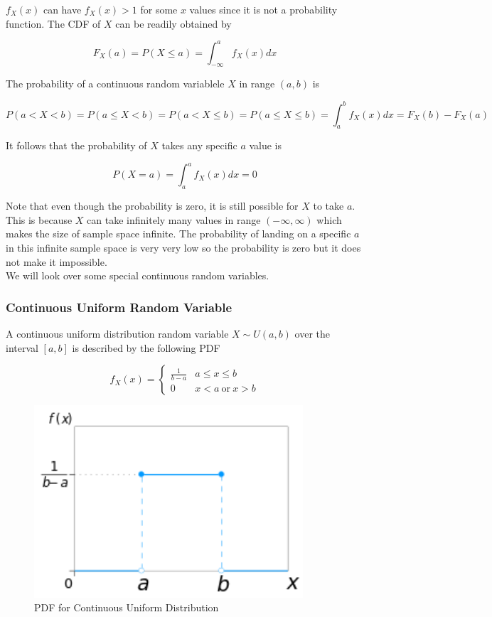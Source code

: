 \documentclass[12pt, a4paper]{article}
\begin{document}
$f_X(x)$ can have $f_X(x)>1$ for some $x$ values since it is not a probability function. The CDF of $X$ can be readily obtained by

$$F_X(a)=P(X\le a)=\int_{-\infty}^a f_X(x) dx$$

The probability of a continuous random variablele $X$ in range $(a,b)$ is

$$P(a < X < b)=P(a \le X < b)=P(a < X \le b)=P(a \le X \le b)=\int_a^b f_X(x) dx = F_X(b)-F_X(a)$$

It follows that the probability of $X$ takes any specific $a$ value is

$$P(X=a)=\int_{a}^a f_X(x) dx=0$$

Note that even though the probability is zero, it is still possible for $X$ to take $a$. This is because $X$ can take infinitely many values in range $(-\infty,\infty)$ which makes the size of sample space infinite. The probability of landing on a specific $a$ in this infinite sample space is very very low so the probability is zero but it does not make it impossible. \\

We will look over some special continuous random variables.

\subsubsection{Continuous Uniform Random Variable}

A continuous uniform distribution random variable $X\sim U(a, b)$ over the interval $[a,b]$ is described by the following PDF

$$
f_X(x)=\begin{cases}
\frac{1}{b - a} & a \le x \le b \\
0 & x<a\ \mathrm{or}\ x>b
\end{cases}
$$

\begin{figure}[H]
\centering
\includegraphics[width=100mm]{13.png}
\caption{PDF for Continuous Uniform Distribution}
\end{figure}
\end{document}

